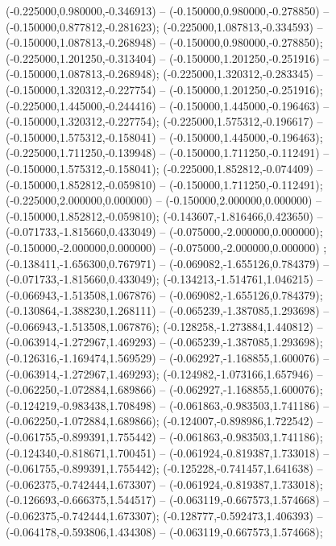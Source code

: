  (-0.225000,0.980000,-0.346913) -- (-0.150000,0.980000,-0.278850) -- (-0.150000,0.877812,-0.281623);
 (-0.225000,1.087813,-0.334593) -- (-0.150000,1.087813,-0.268948) -- (-0.150000,0.980000,-0.278850);
 (-0.225000,1.201250,-0.313404) -- (-0.150000,1.201250,-0.251916) -- (-0.150000,1.087813,-0.268948);
 (-0.225000,1.320312,-0.283345) -- (-0.150000,1.320312,-0.227754) -- (-0.150000,1.201250,-0.251916);
 (-0.225000,1.445000,-0.244416) -- (-0.150000,1.445000,-0.196463) -- (-0.150000,1.320312,-0.227754);
 (-0.225000,1.575312,-0.196617) -- (-0.150000,1.575312,-0.158041) -- (-0.150000,1.445000,-0.196463);
 (-0.225000,1.711250,-0.139948) -- (-0.150000,1.711250,-0.112491) -- (-0.150000,1.575312,-0.158041);
 (-0.225000,1.852812,-0.074409) -- (-0.150000,1.852812,-0.059810) -- (-0.150000,1.711250,-0.112491);
 (-0.225000,2.000000,0.000000) -- (-0.150000,2.000000,0.000000) -- (-0.150000,1.852812,-0.059810);
 (-0.143607,-1.816466,0.423650) -- (-0.071733,-1.815660,0.433049) -- (-0.075000,-2.000000,0.000000);
 (-0.150000,-2.000000,0.000000) -- (-0.075000,-2.000000,0.000000) ;
 (-0.138411,-1.656300,0.767971) -- (-0.069082,-1.655126,0.784379) -- (-0.071733,-1.815660,0.433049);
 (-0.134213,-1.514761,1.046215) -- (-0.066943,-1.513508,1.067876) -- (-0.069082,-1.655126,0.784379);
 (-0.130864,-1.388230,1.268111) -- (-0.065239,-1.387085,1.293698) -- (-0.066943,-1.513508,1.067876);
 (-0.128258,-1.273884,1.440812) -- (-0.063914,-1.272967,1.469293) -- (-0.065239,-1.387085,1.293698);
 (-0.126316,-1.169474,1.569529) -- (-0.062927,-1.168855,1.600076) -- (-0.063914,-1.272967,1.469293);
 (-0.124982,-1.073166,1.657946) -- (-0.062250,-1.072884,1.689866) -- (-0.062927,-1.168855,1.600076);
 (-0.124219,-0.983438,1.708498) -- (-0.061863,-0.983503,1.741186) -- (-0.062250,-1.072884,1.689866);
 (-0.124007,-0.898986,1.722542) -- (-0.061755,-0.899391,1.755442) -- (-0.061863,-0.983503,1.741186);
 (-0.124340,-0.818671,1.700451) -- (-0.061924,-0.819387,1.733018) -- (-0.061755,-0.899391,1.755442);
 (-0.125228,-0.741457,1.641638) -- (-0.062375,-0.742444,1.673307) -- (-0.061924,-0.819387,1.733018);
 (-0.126693,-0.666375,1.544517) -- (-0.063119,-0.667573,1.574668) -- (-0.062375,-0.742444,1.673307);
 (-0.128777,-0.592473,1.406393) -- (-0.064178,-0.593806,1.434308) -- (-0.063119,-0.667573,1.574668);

